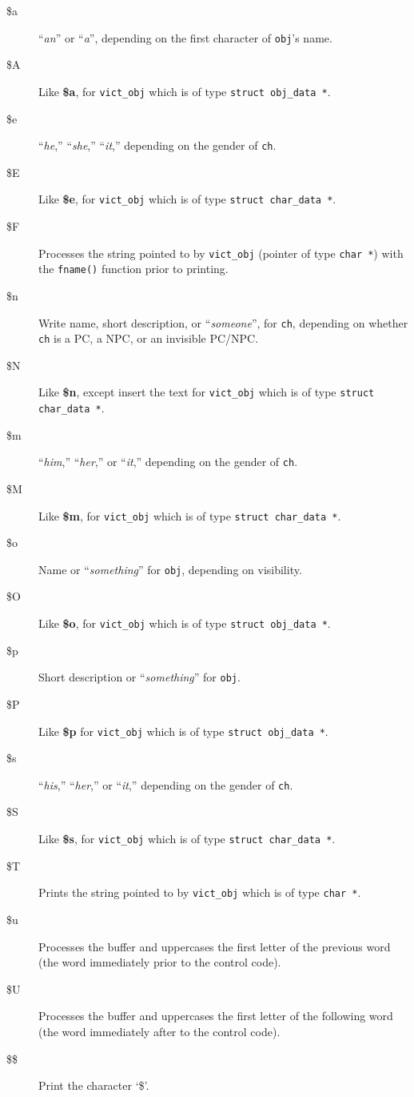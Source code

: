 \documentclass[11pt]{article}
\begin{document}
\begin{multicols}{2}
\begin{description}
\item[\$a] ``{\it an}'' or ``{\it a}'', depending on the first character of \texttt{obj}'s name.
\item[\$A] Like {\bf \$a}, for \texttt{vict\_obj} which is of type \texttt{struct obj\_data~*}.
\item[\$e] ``{\it he},'' ``{\it she},'' ``{\it it},'' depending on the gender of \texttt{ch}.
\item[\$E] Like {\bf \$e}, for \texttt{vict\_obj} which is of type \texttt{struct char\_data~*}.
\item[\$F] Processes the string pointed to by \texttt{vict\_obj} (pointer of type \texttt{char~*}) with the \texttt{fname()} function prior to printing.
\item[\$n] Write name, short description, or ``{\it someone}'', for \texttt{ch}, depending on whether \texttt{ch} is a PC, a NPC, or an invisible PC/NPC.
\item[\$N] Like {\bf \$n}, except insert the text for \texttt{vict\_obj} which is of type \texttt{struct char\_data~*}.
\item[\$m] ``{\it him},'' ``{\it her},'' or ``{\it it},'' depending on the gender of \texttt{ch}.
\item[\$M]  Like {\bf \$m}, for \texttt{vict\_obj} which is of type \texttt{struct char\_data~*}.
\item[\$o] Name or ``{\it something}'' for \texttt{obj}, depending on visibility.
\item[\$O] Like {\bf \$o}, for \texttt{vict\_obj} which is of type \texttt{struct obj\_data~*}.
\item[\$p] Short description or ``{\it something}'' for \texttt{obj}.
\item[\$P] Like {\bf \$p} for \texttt{vict\_obj} which is of type \texttt{struct obj\_data~*}.
\item[\$s] ``{\it his},'' ``{\it her},'' or ``{\it it},'' depending on the gender of \texttt{ch}.
\item[\$S] Like {\bf \$s}, for \texttt{vict\_obj} which is of type \texttt{struct char\_data~*}.
\item[\$T] Prints the string pointed to by \texttt{vict\_obj} which is of type \texttt{char~*}.
\item[\$u] Processes the buffer and uppercases the first letter of the previous word (the word immediately prior to the control code).
 \item[\$U] Processes the buffer and uppercases the first letter of the following word (the word immediately after to the control code).
\item[\$\$] Print the character `\$'.
\end{description}


\end{multicols}
\end{document}
